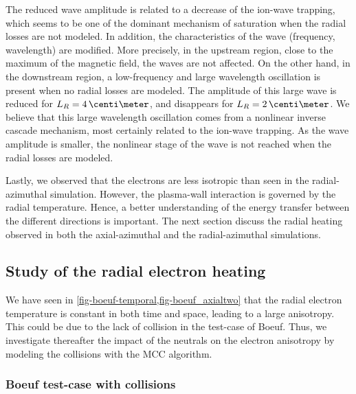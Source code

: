 The reduced wave amplitude is related to a decrease of the ion-wave trapping, which seems to be one of the dominant mechanism of saturation when the radial losses are not modeled.
In addition, the characteristics of the wave (frequency, wavelength) are modified.
More precisely, in the upstream region, close to the maximum of the magnetic field, the waves are not affected.
On the other hand,  in the downstream region, a low-frequency and large wavelength oscillation is present when no radial losses are modeled.
The amplitude of this large wave is reduced for $L_R=4\,\centi\meter$, and disappears for $L_R=2\,\centi\meter$.
We believe that this large wavelength oscillation comes from a nonlinear inverse cascade mechanism, most certainly related to the ion-wave trapping.
As the wave amplitude is smaller, the nonlinear stage of the wave is not reached when the radial losses are modeled.


\vspace{1em}
Lastly, we observed that the electrons are less isotropic than seen in the radial-azimuthal simulation.
However, the plasma-wall interaction is governed by the radial temperature.
Hence, a better understanding of the energy transfer between the different directions is important.
The next section discuss the radial heating observed in both the axial-azimuthal and the radial-azimuthal simulations.


\subsection{Study of the radial electron heating}
\label{sec-rheating}
    We have seen in \cref{fig-boeuf-temporal,fig-boeuf_axialtwo} that the radial electron temperature is constant in both time and space, leading to a large anisotropy.
    This could be due to the lack of collision in the test-case of Boeuf.
    Thus, we investigate thereafter the impact of the neutrals on the electron anisotropy by modeling the collisions with the \ac{MCC} algorithm.
    
  \subsubsection*{Boeuf test-case with collisions} \label{subsec-MCC_boeuf}

